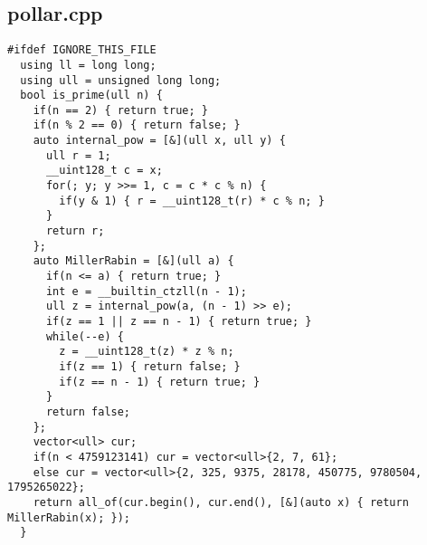 \documentclass[UTF8, a4paper, titlepage, twoside]{ctexart}
\begin{document}
\subsection{pollar.cpp}
\begin{verbatim}
#ifdef IGNORE_THIS_FILE
  using ll = long long;
  using ull = unsigned long long;
  bool is_prime(ull n) {
    if(n == 2) { return true; }
    if(n % 2 == 0) { return false; }
    auto internal_pow = [&](ull x, ull y) {  
      ull r = 1;
      __uint128_t c = x;
      for(; y; y >>= 1, c = c * c % n) {
        if(y & 1) { r = __uint128_t(r) * c % n; }
      }
      return r;
    };
    auto MillerRabin = [&](ull a) {  
      if(n <= a) { return true; }
      int e = __builtin_ctzll(n - 1);
      ull z = internal_pow(a, (n - 1) >> e);
      if(z == 1 || z == n - 1) { return true; }
      while(--e) {
        z = __uint128_t(z) * z % n;
        if(z == 1) { return false; }
        if(z == n - 1) { return true; }
      }
      return false;
    };
    vector<ull> cur;
    if(n < 4759123141) cur = vector<ull>{2, 7, 61};
    else cur = vector<ull>{2, 325, 9375, 28178, 450775, 9780504, 1795265022};
    return all_of(cur.begin(), cur.end(), [&](auto x) { return MillerRabin(x); });
  }


\end{verbatim}
\end{document}
